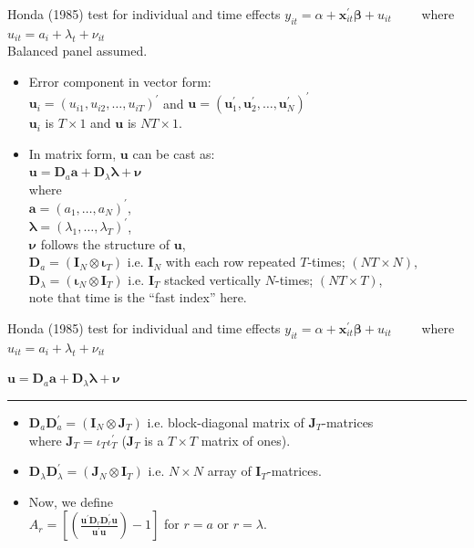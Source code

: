\documentclass[usenames,dvipsnames]{beamer}
\begin{document}
\begin{frame}{Honda (1985) test for individual and time effects}
\small
$y_{it} = \alpha + \bm{x}^{\prime}_{it} \bm{\beta} + u_{it} \qquad$    where $u_{it}=a_i + \lambda_t + \nu_{it}$\\ \medskip Balanced panel assumed. \bigskip
\begin{itemize}
    \item Error component in vector form: \\ \smallskip
    $\bm{u}_i = \left( u_{i1}, u_{i2}, \dots, u_{iT} \right)^{\prime}$ and $\bm{u} = \left( \bm{u}_1^{\prime}, \bm{u}_2^{\prime}, \dots, \bm{u}_N^{\prime} \right)^{\prime}$ \\ \smallskip
    $\bm{u}_i$ is $T \times 1$ and $\bm{u}$ is $NT \times 1$.
    \medskip
    \item In matrix form, $\bm{u}$ can be cast as: \\
    $\bm{u} = \bm{D}_{a} \bm{a} + \bm{D}_{\lambda} \bm{\lambda} + \bm{\nu}$ \\ \smallskip
    where \\$\bm{a} = (a_1, \dots, a_N)^{\prime}$, \\$\bm{\lambda} = (\lambda_1, \dots, \lambda_T)^{\prime}$, \\$\bm{\nu}$ follows the structure of $\bm{u}$,\\
    $\bm{D}_{a} = (\bm{I}_N \otimes \bm{\iota}_T)$ i.e. $\bm{I}_N$ with each row repeated $T$-times; $(NT \times N)$, \\
    $\bm{D}_{\lambda} = ( \bm{\iota}_N \otimes \bm{I}_T )$ i.e. $\bm{I}_T$ stacked vertically $N$-times; $(NT \times T)$, \\ 
    note that time is the ``fast index'' here.
    \end{itemize}
\end{frame}
\begin{frame}{Honda (1985) test for individual and time effects}
$y_{it} = \alpha + \bm{x}^{\prime}_{it} \bm{\beta} + u_{it} \qquad$    where $u_{it}=a_i + \lambda_t + \nu_{it}$\\ \medskip

$\bm{u} = \bm{D}_{a} \bm{a} + \bm{D}_{\lambda} \bm{\lambda} + \bm{\nu}$ \\ \vspace{0.3cm} \hrule \bigskip
\begin{itemize}
    \item $\bm{D}_{a} \bm{D}_{a}^{\prime} = \left(\bm{I}_N \otimes \bm{J}_T \right)$ i.e. block-diagonal matrix of $\bm{J}_T$-matrices \\where $\bm{J}_T=\iota_T \iota_T^{\prime}$  ($\bm{J}_T$ is a $T \times T$ matrix of ones).
    \medskip
    \item $\bm{D}_{\lambda} \bm{D}_{\lambda}^{\prime} = \left(\bm{J}_N \otimes \bm{I}_T   \right)$ i.e. $N\times N$ array of $\bm{I}_T$-matrices.
    \medskip
    \item Now, we define\\ \medskip
    $A_r = \left[ \left( \frac{\bm{u}^{\prime}\bm{D}_r \bm{D}_r^{\prime} \bm{u}}{\bm{u}^{\prime}\bm{u}} \right) - 1 \right]$ for $r=a$ or $r=\lambda$.
    \end{itemize}
\end{frame}
\end{document}
